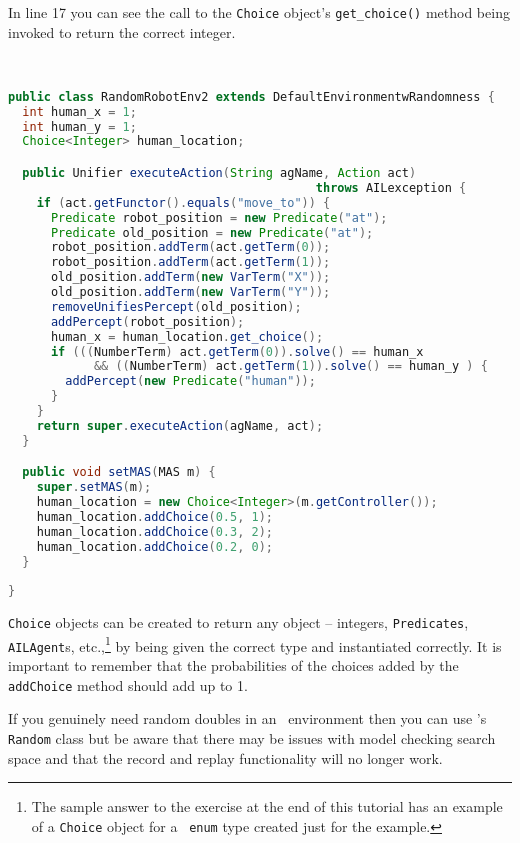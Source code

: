 In line 17 you can see the call to the \texttt{Choice} object's \texttt{get\_choice()} method being invoked to return the correct integer.
\begin{ourexample}
\label{code:RandomRobotEnv2} \quad \\
\begin{lstlisting}[basicstyle=\sffamily,language=Java,style=easslisting]
public class RandomRobotEnv2 extends DefaultEnvironmentwRandomness {
  int human_x = 1;
  int human_y = 1;
  Choice<Integer> human_location;

  public Unifier executeAction(String agName, Action act) 
                                           throws AILexception {
    if (act.getFunctor().equals("move_to")) {
      Predicate robot_position = new Predicate("at");
      Predicate old_position = new Predicate("at");
      robot_position.addTerm(act.getTerm(0));
      robot_position.addTerm(act.getTerm(1));
      old_position.addTerm(new VarTerm("X"));
      old_position.addTerm(new VarTerm("Y"));
      removeUnifiesPercept(old_position);
      addPercept(robot_position);
      human_x = human_location.get_choice();
      if (((NumberTerm) act.getTerm(0)).solve() == human_x 
            && ((NumberTerm) act.getTerm(1)).solve() == human_y ) {
        addPercept(new Predicate("human"));
      }
    }
    return super.executeAction(agName, act);
  }

  public void setMAS(MAS m) {
    super.setMAS(m);
    human_location = new Choice<Integer>(m.getController());
    human_location.addChoice(0.5, 1);
    human_location.addChoice(0.3, 2);
    human_location.addChoice(0.2, 0);
  }
	      
}
\end{lstlisting}
\end{ourexample}

\texttt{Choice} objects can be created to return any object -- integers, \texttt{Predicates}, \texttt{AILAgent}s, etc.,\footnote{The sample answer to the exercise at the end of this tutorial has an example of a \texttt{Choice} object for a \java\ \texttt{enum} type created just for the example.} by being given the correct type and instantiated correctly.  It is important to remember that the probabilities of the choices added by the \texttt{addChoice} method should add up to 1.

If you genuinely need random doubles in an \ail\ environment then you can use \java's \texttt{Random} class but be aware that there may be issues with model checking search space and that the record and replay functionality will no longer work.

